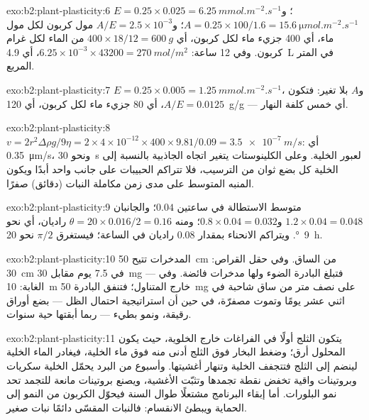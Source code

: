 \begin{solution}{exo:b2:plant-plasticity:6}
$E = 0.25\times 0.025 = \qty{6.25}{mmol.m^{-2}.s^{-1}}$؛ و$A =
0.25\times 100/1.6 = \qty{15.6}{\micro mol.m^{-2}.s^{-1}}$؛ و$A/E =
2.5\times 10^{-3}$ مول كربون لكل مول ماء، أي 400 جزيء
ماء لكل كربون، أي $400\times 18/12 = \qty{600}{g}$ من الماء لكل
غرام كربون. وفي 12 ساعة: $6.25\times 10^{-3}\times 43200 =
\qty{270}{mol/m^2}$، أي \qty{4.9}{L} في المتر المربع.
\end{solution}

\begin{solution}{exo:b2:plant-plasticity:7}
$E = 0.25\times 0.005 = \qty{1.25}{mmol.m^{-2}.s^{-1}}$، و$A$
بلا تغير: فتكون $A/E = 0.0125$، أي 80 جزيء ماء لكل كربون، أي \qty{120}{g/g} ---
أي خمس كلفة النهار.
\end{solution}

\begin{solution}{exo:b2:plant-plasticity:8}
$v = 2r^{2}\Delta\rho g/9\eta = 2\times 4\times 10^{-12}\times
400\times 9.81/0.09 = \qty{3.5e-7}{m/s}$: أي \qty{0.35}{\micro m/s}،
ونحو \qty{30}{s} لعبور الخلية. وعلى الكلينوستات يتغير اتجاه
الجاذبية بالنسبة إلى الخلية كل بضع ثوان من الترسيب،
فلا تتراكم الحبيبات على جانب واحد أبدًا ويكون المنبه
المتوسط على مدى زمن مكاملة النبات (دقائق) صفرًا.
\end{solution}

\begin{solution}{exo:b2:plant-plasticity:9}
متوسط الاستطالة في ساعتين $0.04$؛ والجانبان $1.2\times 0.04 = 0.048$
و$0.8\times 0.04 = 0.032$؛ ومنه $\theta = 20\times 0.016/2 = 0.16$
راديان، أي نحو \qty{9}{\degree}. ويتراكم الانحناء بمقدار $0.08$ راديان في
الساعة؛ فيستغرق $\pi/2$ نحو \qty{20}{h}.
\end{solution}

\begin{solution}{exo:b2:plant-plasticity:10}
المدخرات تتيح \qty{50}{cm} من الساق. وفي حقل القراص: \qty{30}{cm} في
7.5 يوم مقابل \qty{30}{mg} --- فتبلغ البادرة الضوء ولها
مدخرات فائضة. وفي الغابة: \qty{10}{m} خارج المتناول؛ فتنفق البادرة
\qty{50}{mg} على نصف متر من ساق شاحبة في اثني عشر
يومًا وتموت مصفرّة، في حين أن استراتيجية احتمال الظل --- بضع
أوراق رقيقة، ونمو بطيء --- ربما أبقتها حية سنوات.
\end{solution}

\begin{solution}{exo:b2:plant-plasticity:11}
يتكون الثلج أولًا في الفراغات خارج الخلوية، حيث يكون المحلول
أرق؛ وضغط البخار فوق الثلج أدنى منه فوق ماء
الخلية، فيغادر الماء الخلية لينضم إلى الثلج فتتجفف الخلية
وتنهار أغشيتها. وأسبوع من البرد يحمّل
الخلية سكريات وبروتينات واقية تخفض نقطة تجمدها
وتثبّت الأغشية، ويصنع بروتينات مانعة للتجمد
تحد نمو البلورات. أما إبقاء البرنامج مشتعلًا طوال السنة فيحوّل
الكربون من النمو إلى الحماية ويبطئ الانقسام: فالنبات المقسّى
دائمًا نبات صغير.
\end{solution}

